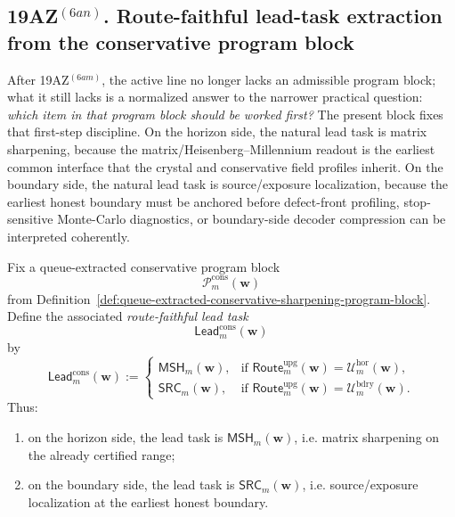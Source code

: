 \subsection*{19AZ$^{(6an)}$. Route-faithful lead-task extraction from the conservative program block}
\label{sec:route-faithful-lead-task-extraction-from-the-conservative-program-block}
After 19AZ$^{(6am)}$, the active line no longer lacks an admissible program block; what it still lacks is a normalized answer to the narrower practical question: \emph{which item in that program block should be worked first?} The present block fixes that first-step discipline. On the horizon side, the natural lead task is matrix sharpening, because the matrix/Heisenberg--Millennium readout is the earliest common interface that the crystal and conservative field profiles inherit. On the boundary side, the natural lead task is source/exposure localization, because the earliest honest boundary must be anchored before defect-front profiling, stop-sensitive Monte-Carlo diagnostics, or boundary-side decoder compression can be interpreted coherently.

\begin{definition}
\label{def:route-faithful-lead-task}
Fix a queue-extracted conservative program block
\[
 \mathcal P^{\mathrm{cons}}_{m}(\mathbf w)
\]
from Definition~\ref{def:queue-extracted-conservative-sharpening-program-block}.
Define the associated \emph{route-faithful lead task}
\[
 \mathsf{Lead}^{\mathrm{cons}}_{m}(\mathbf w)
\]
by
\[
 \mathsf{Lead}^{\mathrm{cons}}_{m}(\mathbf w)
 :=
 \begin{cases}
 \mathsf{MSH}_{m}(\mathbf w), & \text{if }\mathsf{Route}^{\mathrm{upg}}_{m}(\mathbf w)=\mathcal U^{\mathrm{hor}}_{m}(\mathbf w),\\[2mm]
 \mathsf{SRC}_{m}(\mathbf w), & \text{if }\mathsf{Route}^{\mathrm{upg}}_{m}(\mathbf w)=\mathcal U^{\mathrm{bdry}}_{m}(\mathbf w).
 \end{cases}
\]
Thus:
\begin{enumerate}[label=(\roman*)]
 \item on the horizon side, the lead task is \(\mathsf{MSH}_{m}(\mathbf w)\), i.e. matrix sharpening on the already certified range;
 \item on the boundary side, the lead task is \(\mathsf{SRC}_{m}(\mathbf w)\), i.e. source/exposure localization at the earliest honest boundary.
\end{enumerate}
\end{definition}


